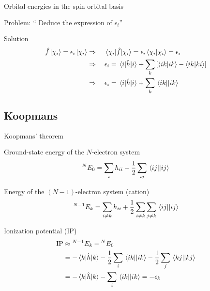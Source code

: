 \documentclass[aspectratio=169,9pt]{beamer}
\newcommand{\hh}{\Hat{h}}
\newcommand{\hf}{\Hat{f}}
\newcommand{\violet}[1]{\textcolor{hfViolet}{#1}}
\begin{document}
\begin{frame}{Orbital energies in the spin orbital basis}
	\begin{block}{Problem:}
		\violet{`` Deduce the expression of $\epsilon_i$''}
	\end{block}
	\pause
	\begin{block}{Solution}
		\begin{align*}
			\hf \ket{\chi_i} = \epsilon_i \ket{\chi_i}
			& \Rightarrow \quad \mel{\chi_i}{\hf}{\chi_i} = \epsilon_i \braket{\chi_i}{\chi_i} = \epsilon_i
			\\
			& \Rightarrow \quad \epsilon_i = \mel{i}{\hh}{i} + \sum_k \qty[ \braket{ik}{ik} - \braket{ik}{ki} ]
			\\
			& \Rightarrow \quad \epsilon_i = \mel{i}{\hh}{i} + \sum_k \mel{ik}{}{ik}
		\end{align*}
	\end{block}
\end{frame}


\subsection{Koopmans}
\begin{frame}{Koopmans' theorem}
	\small
	\begin{block}{Ground-state energy of the $N$-electron system}
		\begin{equation*}
			{}^{N} E_0  = \sum_{i} h_{ii} + \frac{1}{2} \sum_{ij} \mel{ij}{}{ij}
		\end{equation*}
	\end{block}
	\begin{block}{Energy of the $(N-1)$-electron system (cation)}
		\begin{equation*}
			{}^{N-1}E_k  = \sum_{i \neq k} h_{ii} + \frac{1}{2} \sum_{i \neq k} \sum_{j \neq k} \mel{ij}{}{ij}
		\end{equation*}
	\end{block}
	\begin{block}{Ionization potential (IP)}
		\begin{equation*}
		\begin{split}
			\text{IP} 
			& \approx {}^{N-1}E_k - {}^{N} E_0
			\\
			& = - \mel{k}{\hh}{k} - \frac{1}{2} \sum_{i} \mel{ik}{}{ik} - \frac{1}{2} \sum_{j} \mel{kj}{}{kj}
			\\
			& = - \mel{k}{\hh}{k} - \sum_{i} \mel{ik}{}{ik} 
			= - \epsilon_k 
		\end{split}
		\end{equation*}
	\end{block}
\end{frame}
\end{document}
